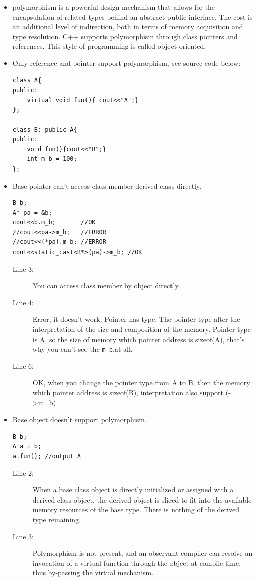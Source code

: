 \documentclass[a4paper,11pt,twoside]{book}
\begin{document}
\begin{itemize}
	\item polymorphism is a powerful design mechanism that allows for the encapsulation of related types behind an abstract public interface, The cost is an additional level of indirection, both in terms of memory acquisition and type resolution. C++ supports polymorphism through class pointers and references. This style of programming is called object-oriented.
	
	\item Only reference and pointer support polymorphism, see source code below:

\begin{lstlisting}[numbers=none]
class A{
public:
	virtual void fun(){ cout<<"A";}
};
	
class B: public A{
public:
	void fun(){cout<<"B";}
	int m_b = 100;
};
\end{lstlisting}

	\item Base pointer can't access class member derived class directly.
	
\begin{lstlisting}
B b;
A* pa = &b;
cout<<b.m_b;       //OK
//cout<<pa->m_b;   //ERROR 
//cout<<(*pa).m_b; //ERROR
cout<<static_cast<B*>(pa)->m_b; //OK
\end{lstlisting}
\begin{description}
	\item[Line 3:] You can access class member by object directly.
	\item[Line 4:] Error, it doesn't work. Pointer has type. The pointer type alter the interpretation of the size and composition of the memory. Pointer type is A, so the size of memory which pointer address is sizeof(A), that's why you can't see the \texttt{m\_b}.at all.
	\item[Line 6:] OK, when you change the pointer type from A to B, then the memory which pointer address is sizeof(B), interpretation also support (->m\_b) 
\end{description}

\item Base object doesn't support polymorphism.
\begin{lstlisting}
B b;
A a = b;
a.fun(); //output A
\end{lstlisting}
\begin{description}
	\item[Line 2:] When a base class object is directly initialized or assigned with a derived class object, the derived object is sliced to fit into the available memory resources of the base type. There is nothing of the derived type remaining. 
	\item[Line 3:] Polymorphism is not present, and an observant compiler can resolve an invocation of a virtual function through the object at compile time, thus by-passing the virtual mechanism.
\end{description}


\end{itemize}
\end{document}
